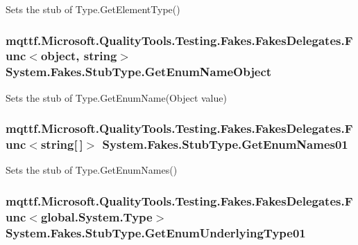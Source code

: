 Sets the stub of Type.\-Get\-Element\-Type()

\hypertarget{class_system_1_1_fakes_1_1_stub_type_aa7c481bc636ea05c398e32ee2386e210}{
\subsubsection[{Get\-Enum\-Name\-Object}]{\setlength{\rightskip}{0pt plus 5cm}mqttf.\-Microsoft.\-Quality\-Tools.\-Testing.\-Fakes.\-Fakes\-Delegates.\-Func$<$object, string$>$ System.\-Fakes.\-Stub\-Type.\-Get\-Enum\-Name\-Object}}\label{class_system_1_1_fakes_1_1_stub_type_aa7c481bc636ea05c398e32ee2386e210}


Sets the stub of Type.\-Get\-Enum\-Name(\-Object value)

\hypertarget{class_system_1_1_fakes_1_1_stub_type_a973c211d65e90adb1b25fa3fb7922e50}{
\subsubsection[{Get\-Enum\-Names01}]{\setlength{\rightskip}{0pt plus 5cm}mqttf.\-Microsoft.\-Quality\-Tools.\-Testing.\-Fakes.\-Fakes\-Delegates.\-Func$<$string\mbox{[}$\,$\mbox{]}$>$ System.\-Fakes.\-Stub\-Type.\-Get\-Enum\-Names01}}\label{class_system_1_1_fakes_1_1_stub_type_a973c211d65e90adb1b25fa3fb7922e50}


Sets the stub of Type.\-Get\-Enum\-Names()

\hypertarget{class_system_1_1_fakes_1_1_stub_type_a9e8d3d2beb9b7497dbb9e520d9440d39}{
\subsubsection[{Get\-Enum\-Underlying\-Type01}]{\setlength{\rightskip}{0pt plus 5cm}mqttf.\-Microsoft.\-Quality\-Tools.\-Testing.\-Fakes.\-Fakes\-Delegates.\-Func$<$global.\-System.\-Type$>$ System.\-Fakes.\-Stub\-Type.\-Get\-Enum\-Underlying\-Type01}}\label{class_system_1_1_fakes_1_1_stub_type_a9e8d3d2beb9b7497dbb9e520d9440d39}


